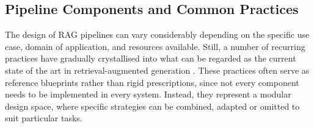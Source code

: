 \begin{spacing}{1.5}
\subsection{Pipeline Components and Common Practices}
The design of RAG pipelines can vary considerably depending on the specific use case, domain of application, and resources available. Still, a number of recurring practices have gradually crystallised into what can be regarded as the current state of the art in retrieval-augmented generation \citep{vaibhav_retrieval-augmented_2025,wang_searching_2024,arslan_survey_2024,gao_retrieval-augmented_2024,gupta_comprehensive_2024}. These practices often serve as reference blueprints rather than rigid prescriptions, since not every component needs to be implemented in every system. Instead, they represent a modular design space, where specific strategies can be combined, adapted or omitted to suit particular tasks.


\end{spacing}
